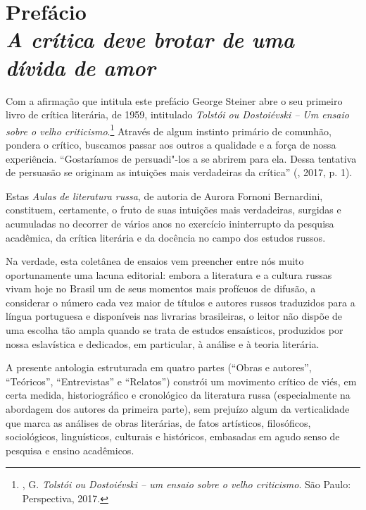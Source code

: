 \chapter*{Prefácio\\
\bigskip
\emph{A crítica deve brotar de uma dívida de amor}}




Com a afirmação que intitula este prefácio George Steiner abre o seu primeiro livro de crítica
literária, de 1959, intitulado \emph{Tolstói ou Dostoiévski -- Um ensaio
sobre o velho criticismo}.\footnote{\scalebox{0.8}{STEINER}, G. \emph{Tolstói ou
  Dostoiévski -- um ensaio sobre o velho criticismo}. São Paulo:
  Perspectiva, 2017.} Através de algum instinto primário de comunhão,
pondera o crítico, buscamos passar aos outros a qualidade e a força de
nossa experiência. ``Gostaríamos de persuadi"-los a se abrirem para ela.
Dessa tentativa de persuasão se originam as intuições mais verdadeiras
da crítica'' (\scalebox{0.8}{STEINER}, 2017, p. 1).

Estas \emph{Aulas de literatura russa}, de autoria de Aurora Fornoni
Bernardini, constituem, certamente, o fruto de suas intuições mais
verdadeiras, surgidas e acumuladas no decorrer de vários anos no
exercício ininterrupto da pesquisa acadêmica, da crítica literária e da
docência no campo dos estudos russos.

Na verdade, esta coletânea de ensaios vem preencher entre nós muito
oportunamente uma lacuna editorial: embora a literatura e a cultura
russas vivam hoje no Brasil um de seus momentos mais profícuos de
difusão, a considerar o número cada vez maior de títulos e
autores russos traduzidos para a língua portuguesa e disponíveis nas
livrarias brasileiras, o leitor não dispõe de uma escolha
tão ampla quando se trata de estudos ensaísticos,
produzidos por nossa eslavística e dedicados, em particular, à análise e
à teoria literária.

A presente antologia estruturada em quatro partes (``Obras e
autores'', ``Teóricos'', ``Entrevistas'' e ``Relatos'') constrói um movimento crítico de viés,
em certa medida, historiográfico e cronológico da literatura russa
(especialmente na abordagem dos autores da primeira parte),
sem prejuízo algum da verticalidade que marca as análises de obras literárias, de fatos artísticos, filosóficos,
sociológicos, linguísticos, culturais e históricos, embasadas em agudo
senso de pesquisa e ensino acadêmicos.

